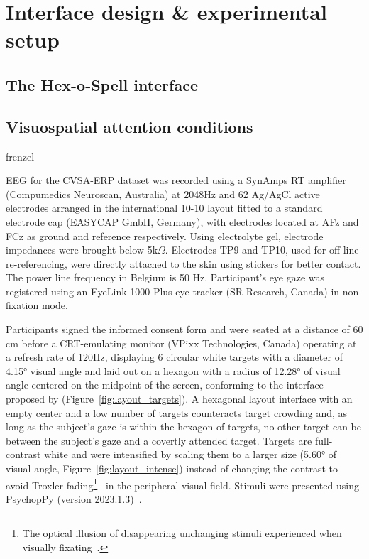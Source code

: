 \chapter{Interface design \& experimental setup}
\section{The Hex-o-Spell interface}
\section{Visuospatial attention conditions}
frenzel


EEG for the CVSA-ERP dataset was recorded using a SynAmps RT amplifier
(Compumedics Neuroscan, Australia) at 2048Hz and 62 Ag/AgCl active electrodes arranged in the
international 10-10 layout fitted to a standard electrode cap (EASYCAP GmbH,
Germany), with electrodes located at AFz and FCz as ground and reference respectively.
Using electrolyte gel, electrode impedances were brought below 5k$\Omega$.
Electrodes TP9 and TP10, used for off-line re-referencing, were directly
attached to the skin using stickers for better contact.
The power line frequency in Belgium is 50 Hz.
Participant's eye gaze was registered using an EyeLink 1000 Plus eye tracker (SR Research,
Canada) in non-fixation mode.

Participants signed the informed consent form and were seated at a distance of
60 cm before a CRT-emulating monitor (VPixx
Technologies, Canada) operating at a refresh rate of 120Hz, displaying 6
circular white targets with a diameter of 4.15° visual angle and laid out on a hexagon
with a radius of 12.28° of visual angle centered on the midpoint of the screen,
conforming to the interface proposed by \cite{Treder2010} (Figure~\ref{fig:layout_targets}).
A hexagonal layout interface with an empty center and a low number of targets
counteracts target crowding and, as long as the subject’s gaze is within the hexagon of
targets, no other target can be between the subject’s gaze and a covertly
attended target.
Targets are full-contrast white and were intensified by scaling them to a
larger size (5.60° of visual angle, Figure~\ref{fig:layout_intense}) instead of changing the contrast to avoid Troxler-fading\footnote{The optical illusion of disappearing unchanging stimuli
experienced when visually fixating~\cite{Troxler1804}.}~\cite{Treder2010} in the
peripheral visual field.
Stimuli were presented using PsychopPy (version 2023.1.3)~\cite{Peirce2019}.


